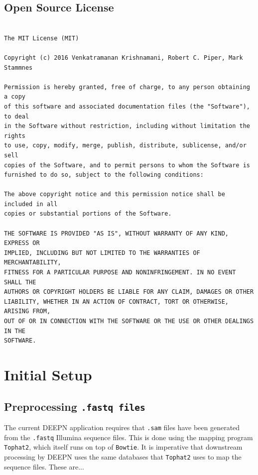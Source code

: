 \documentclass[11pt,fleqn]{book} %
\begin{document}
\section{Open Source License}\label{license}
\begin{lstlisting}

The MIT License (MIT)

Copyright (c) 2016 Venkatramanan Krishnamani, Robert C. Piper, Mark Stammnes

Permission is hereby granted, free of charge, to any person obtaining a copy
of this software and associated documentation files (the "Software"), to deal
in the Software without restriction, including without limitation the rights
to use, copy, modify, merge, publish, distribute, sublicense, and/or sell
copies of the Software, and to permit persons to whom the Software is
furnished to do so, subject to the following conditions:

The above copyright notice and this permission notice shall be included in all
copies or substantial portions of the Software.

THE SOFTWARE IS PROVIDED "AS IS", WITHOUT WARRANTY OF ANY KIND, EXPRESS OR
IMPLIED, INCLUDING BUT NOT LIMITED TO THE WARRANTIES OF MERCHANTABILITY,
FITNESS FOR A PARTICULAR PURPOSE AND NONINFRINGEMENT. IN NO EVENT SHALL THE
AUTHORS OR COPYRIGHT HOLDERS BE LIABLE FOR ANY CLAIM, DAMAGES OR OTHER
LIABILITY, WHETHER IN AN ACTION OF CONTRACT, TORT OR OTHERWISE, ARISING FROM,
OUT OF OR IN CONNECTION WITH THE SOFTWARE OR THE USE OR OTHER DEALINGS IN THE
SOFTWARE.
\end{lstlisting}


\chapter{Initial Setup}

\section{Preprocessing \texttt{.fastq files}}

The current DEEPN application requires that \texttt{.sam} files have been generated from the \texttt{.fastq} Illumina sequence files.  This is done using the mapping program \texttt{Tophat2}, which itself runs on top of \texttt{Bowtie}.  It is imperative that downstream processing by DEEPN uses the same databases that \texttt{Tophat2} uses to map the sequence files. These are...
\end{document}

